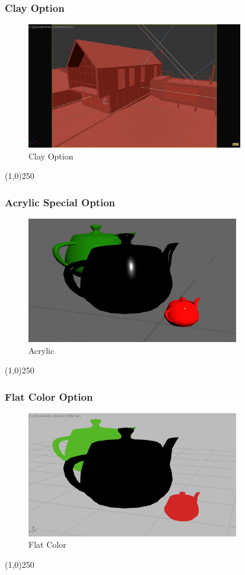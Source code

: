\begin{frame}
\frametitle{Clay Option}
\begin{figure}
	\centering
	\includegraphics[height=5.5cm]{img/ViewportOptions/ClayHouse.jpg}
	\caption{Clay Option}
	\label{fig:ClayOption}
\end{figure}
\end{frame}
\begin{center}\line(1,0){250}\end{center}



\begin{frame}
\frametitle{Acrylic Special Option}
\begin{figure}
	\centering
	\includegraphics[height=5.5cm]{img/ViewportOptions/Acrylic.jpg}
	\caption{Acrylic}
	\label{fig:AcrylicOption}
\end{figure}
\end{frame}
\begin{center}\line(1,0){250}\end{center}



\begin{frame}
\frametitle{Flat Color Option}
\begin{figure}
	\centering
	\includegraphics[height=5.5cm]{img/ViewportOptions/FlatColor.jpg}
	\caption{Flat Color}
	\label{fig:FlatColorOption}
\end{figure}
\end{frame}
\begin{center}\line(1,0){250}\end{center}



